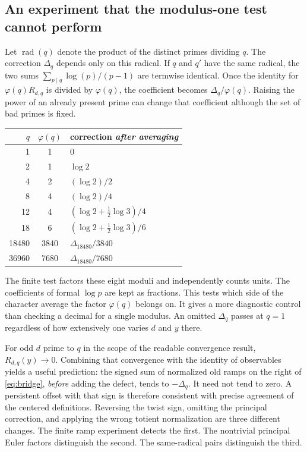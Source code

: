 \documentclass[12pt,letterpaper]{article}
\begin{document}
\subsection{An experiment that the modulus-one test cannot perform}
Let $\operatorname{rad}(q)$ denote the product of the distinct primes dividing $q$. The correction $\Delta_q$ depends only on this radical. If $q$ and $q'$ have the same radical, the two sums $\sum_{p\mid q}\log(p)/(p-1)$ are termwise identical. Once the identity for $\varphi(q)R_{d,q}$ is divided by $\varphi(q)$, the coefficient becomes $\Delta_q/\varphi(q)$. Raising the power of an already present prime can change that coefficient although the set of bad primes is fixed.

\begin{center}\small\begin{tabular}{@{}rcl@{}}\toprule
$q$ & $\varphi(q)$ & correction \emph{after averaging}\\\midrule
1 & 1 & $0$\\
2 & 1 & $\log 2$\\
4 & 2 & $(\log 2)/2$\\
8 & 4 & $(\log 2)/4$\\
12 & 4 & $(\log 2+\tfrac12\log 3)/4$\\
18 & 6 & $(\log 2+\tfrac12\log 3)/6$\\
18480 & 3840 & $\Delta_{18480}/3840$\\
36960 & 7680 & $\Delta_{18480}/7680$\\\bottomrule\end{tabular}\end{center}
The finite test factors these eight moduli and independently counts units. The coefficients of formal $\log p$ are kept as fractions. This tests which side of the character average the factor $\varphi(q)$ belongs on. It gives a more diagnostic control than checking a decimal for a single modulus. An omitted $\Delta_q$ passes at $q=1$ regardless of how extensively one varies $d$ and $y$ there.

For odd $d$ prime to $q$ in the scope of the readable convergence result, $R_{d,q}(y)\to0$. Combining that convergence with the identity of observables yields a useful prediction: the signed sum of normalized old ramps on the right of \eqref{eq:bridge}, \emph{before} adding the defect, tends to $-\Delta_q$. It need not tend to zero. A persistent offset with that sign is therefore consistent with precise agreement of the centered definitions. Reversing the twist sign, omitting the principal correction, and applying the wrong totient normalization are three different changes. The finite ramp experiment detects the first. The nontrivial principal Euler factors distinguish the second. The same-radical pairs distinguish the third.
\end{document}
